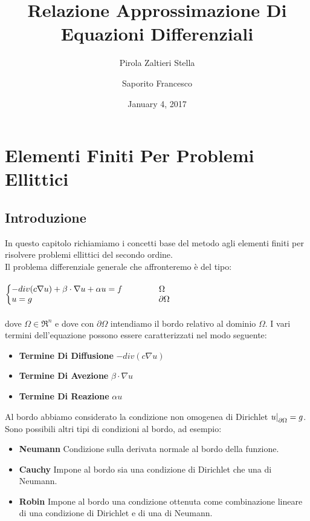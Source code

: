 \documentclass[12pt,a4paper]{report}
\author{Pirola Zaltieri Stella \and Saporito Francesco}
\title{Relazione Approssimazione Di Equazioni Differenziali}
\date{January 4, 2017}
\makeatletter
\theoremstyle{theorem}
\theoremstyle{theorem}
\theoremstyle{definition}
\newenvironment{system}
{\left\lbrace\begin{array}{@{}l@{}}}
{\end{array}\right.}
\newcommand\restr[2]{{%
  \left.\kern-\nulldelimiterspace %
  #1 %
  \right|_{#2} %
  }}
\makeatother
\begin{document}
\maketitle

\tableofcontents

% 

\chapter{Elementi Finiti Per Problemi Ellittici}

\section{Introduzione}
In questo capitolo richiamiamo i concetti base del metodo agli elementi finiti per risolvere problemi ellittici del secondo ordine.\\
Il problema differenziale generale che affronteremo è del tipo:\\\\  \label{Problema Di Dirichlet}
\begin{math}
\begin{system}
-div(c\nabla{u})+\beta \cdot \nabla{u} + \alpha u = f \qquad \qquad \ \Omega \\
u = g \qquad \qquad \qquad \qquad \qquad \qquad \qquad \quad \partial \Omega \\
\end{system}
\end{math}
\hfill \\\\
dove $\Omega \in \Re^{n}$ e dove con $\partial \Omega$ intendiamo il bordo relativo al dominio $\Omega$. I vari termini dell'equazione possono essere caratterizzati nel modo seguente:
\begin{itemize}
	\item \textbf{Termine Di Diffusione} $-div(c\nabla{u})$
	\item \textbf{Termine Di Avezione} $\beta \cdot \nabla{u}$
	\item \textbf{Termine Di Reazione} $\alpha u$	
\end{itemize}
Al bordo abbiamo considerato la condizione non omogenea di Dirichlet $ \restr{u}{\partial \Omega} = g$. Sono possibili altri tipi di condizioni al bordo, ad esempio:
\begin{itemize}
	\item \textbf{Neumann} Condizione sulla derivata normale al bordo della funzione.
	\item \textbf{Cauchy} Impone al bordo sia una condizione di Dirichlet che una di Neumann.
	\item \textbf{Robin} Impone al bordo una condizione ottenuta come combinazione lineare di una condizione di Dirichlet e di una di Neumann.
\end{itemize}
\end{document}
